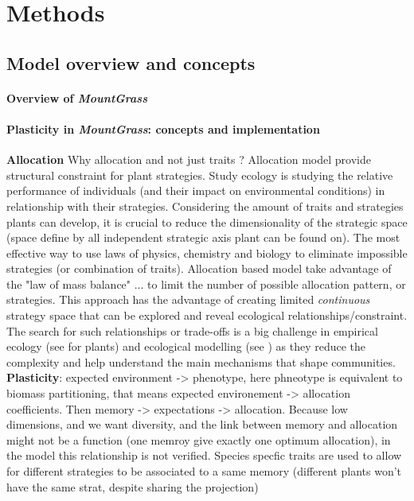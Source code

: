 \documentclass[review]{elsarticle}
\begin{document}
\section{Methods}
\subsection{Model overview and concepts}
\paragraph{Overview of \textit{MountGrass}}
\paragraph{Plasticity in \textit{MountGrass}: concepts and implementation}
\textbf{Allocation} Why allocation and not just traits ? Allocation model provide structural constraint for plant strategies. Study ecology is studying the relative performance of individuals (and their impact on environmental conditions) in relationship with their strategies. Considering the amount of traits and strategies plants can develop, it is crucial to reduce the dimensionality of the strategic space (space define by all independent strategic axis plant can be found on). The most effective way to use laws of physics, chemistry and biology to eliminate impossible strategies (or combination of traits). Allocation based model take advantage of the "law of mass balance" ... to limit the number of possible allocation pattern, or strategies. This approach has the advantage of creating limited \textit{continuous} strategy space that can be explored and reveal ecological relationships/constraint. The search for such relationships or trade-offs is a big challenge in empirical ecology (see \cite{reich_evolution_2003, wright_worldwide_2004, diaz_plant_2004, diaz_global_2016} for plants) and ecological modelling (see \cite{reineking_environmental_2006, falster_plant:_2016}) as they reduce the complexity and help understand the main mechanisms that shape communities.\\

\textbf{Plasticity}: expected environment -> phenotype, here phneotype is equivalent to biomass partitioning, that means expected environement -> allocation coefficients. Then memory -> expectations -> allocation. Because low dimensions, and we want diversity, and the link between memory and allocation might not be a function (one memroy give exactly one optimum allocation), in the model this relationship is not verified. Species specfic traits are used to allow for different strategies to be associated to a same memory (different plants won't have the same strat, despite sharing the projection)
\end{document}
